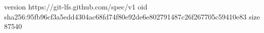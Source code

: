 version https://git-lfs.github.com/spec/v1
oid sha256:95fb96cf3a5edd4304ac68fd74f80e92de6e802791487c26f267705c59410e83
size 87540
